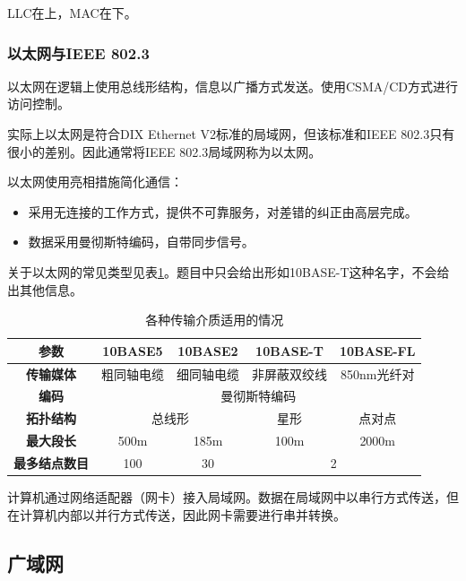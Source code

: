 \documentclass[12pt, a4paper, oneside]{ctexart}
\begin{document}
LLC在上，MAC在下。

\subsubsection{以太网与IEEE 802.3}

以太网在逻辑上使用总线形结构，信息以广播方式发送。使用CSMA/CD方式进行访问控制。

实际上以太网是符合DIX Ethernet V2标准的局域网，但该标准和IEEE 802.3只有很小的差别。因此通常将IEEE 802.3局域网称为以太网。

以太网使用亮相措施简化通信：
\begin{itemize}
    \item 采用无连接的工作方式，提供不可靠服务，对差错的纠正由高层完成。
    \item 数据采用曼彻斯特编码，自带同步信号。
\end{itemize}

关于以太网的常见类型见表\ref{ethernet}。题目中只会给出形如10BASE-T这种名字，不会给出其他信息。

\begin{table}
    \centering
    \caption{各种传输介质适用的情况}
    \label{ethernet}
    \begin{tabular}{|c|c|c|c|c|}
        \hline
        \textbf{参数} & \textbf{10BASE5} & \textbf{10BASE2} & \textbf{10BASE-T} & \textbf{10BASE-FL} \\
        \hline
        \textbf{传输媒体} & 粗同轴电缆 & 细同轴电缆 & 非屏蔽双绞线 & 850nm光纤对 \\
        \hline
        \textbf{编码} & \multicolumn{4}{|c|}{曼彻斯特编码} \\
        \hline
        \textbf{拓扑结构} & \multicolumn{2}{|c|}{总线形} & 星形 & 点对点 \\
        \hline
        \textbf{最大段长} & 500m & 185m & 100m & 2000m \\
        \hline
        \textbf{最多结点数目} & 100 & 30 & \multicolumn{2}{|c|}{2} \\
        \hline
    \end{tabular}
\end{table}

计算机通过网络适配器（网卡）接入局域网。数据在局域网中以串行方式传送，但在计算机内部以并行方式传送，因此网卡需要进行串并转换。

\subsection{广域网}
\end{document}
